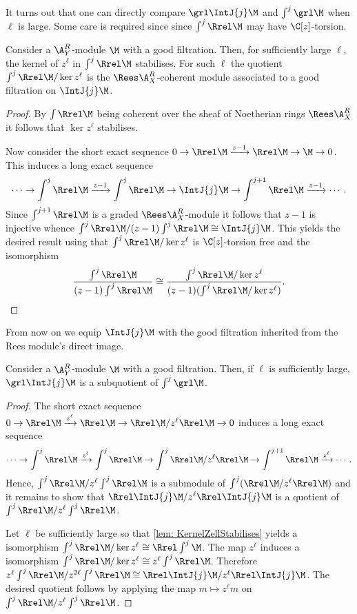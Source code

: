 It turns out that one can directly compare $\grl\IntJ{j}\M$ and $\int^j \grl\M$ when $\ell$ is large. Some care is required since since $\int^j \Rrel \M$ may have $\C[z]$-torsion.
\begin{lemma}\label{lem: KernelZellStabilises}
Consider a $\A_Y^R$-module $\M$ with a good filtration. Then, for sufficiently large $\ell$, the kernel of $z^\ell$ in $\int^j \Rrel \M$ stabilises. For such $\ell$ the quotient $\int^j \Rrel \M/ \ker z^\ell$ is the $\Rees \A_X^R$-coherent module associated to a good filtration on $\IntJ{j} \M$.
\end{lemma}
\begin{proof}
By $\int \Rrel \M$ being coherent over the sheaf of Noetherian rings $\Rees\A_X^R$ it follows that $\ker z^\ell$ stabilises.

Now consider the short exact sequence $0\to \Rrel \M \xrightarrow{z-1} \Rrel \M \to \M \to 0$. This induces a long exact sequence
$$\cdots \to \int^j \Rrel \M \xrightarrow{z-1} \int^j \Rrel \M \to \IntJ{j} \M \to \int^{j+1} \Rrel \M \xrightarrow{z-1}\cdots. $$
Since $\int^{j+1} \Rrel \M$ is a graded $\Rees\A_X^R$-module it follows that $z-1$ is injective whence $\int^j \Rrel \M / (z-1)\int^j \Rrel \M \cong \IntJ{j} \M$. This yields the desired result using that $\int^j \Rrel \M / \ker z^\ell$ is $\C[z]$-torsion free and the isomorphism
$$ \frac{\int^j \Rrel \M }{(z-1)\int^j \Rrel \M } \cong \frac{\int^j \Rrel \M /\ker z^\ell }{(z-1)(\int^j \Rrel \M/\ker z^\ell) }.$$
\end{proof}
From now on we equip $\IntJ{j} \M$ with the good filtration inherited from the Rees module's direct image.
\begin{lemma}\label{lem: EllLargeSubquotent}
Consider a $\A_Y^R$-module $\M$ with a good filtration. Then, if $\ell$ is sufficiently large, $\grl \IntJ{j}\M$ is a subquotient of $\int^j\grl\M$.
\end{lemma}
\begin{proof}
The short exact sequence $0\to \Rrel\M \xrightarrow{z^\ell}\Rrel \M \to \Rrel\M / z^\ell \Rrel\M \to 0$ induces a long exact sequence
$$\cdots \to \int^j \Rrel \M \xrightarrow{z^\ell} \int^j \Rrel \M \to \int^j \Rrel\M/z^\ell \Rrel\M \to \int^{j+1} \Rrel \M \xrightarrow{z^\ell}\cdots. $$
Hence, $\int^j \Rrel \M / z^\ell \int^j \Rrel \M$ is a submodule of $\int^j (\Rrel\M/z^\ell \Rrel\M)$ and it remains to show that $\Rrel \IntJ{j} \M/ z^\ell \Rrel \IntJ{j} \M$ is a quotient of $\int^j \Rrel \M / z^\ell \int^j \Rrel \M$.

Let $\ell$ be sufficiently large so that \cref{lem: KernelZellStabilises} yields a isomorphism $\int^j \Rrel \M / \ker z^\ell \cong \Rrel\int^j \M$. The map $z^\ell$ induces a isomorphism $\int^j \Rrel \M / \ker z^\ell \cong z^\ell \int^j \Rrel \M$. Therefore $z^\ell \int^j \Rrel \M / z^{2\ell}\int^j \Rrel\M \cong \Rrel \IntJ{j} \M / z^\ell \Rrel\IntJ{j} \M $.
The desired quotient follows by applying the map $m\mapsto z^\ell m$ on $\int^j \Rrel \M / z^\ell \int^j \Rrel \M$.
\end{proof}
